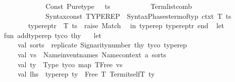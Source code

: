 \begin{isabellebody}
\ \ \ \ \ \ \ \ \ \ \ \ {\isacharparenleft}{\kern0pt}Const\ {\isacharparenleft}{\kern0pt}\isactrlconstUNDERSCOREsyntax {\isasymopen}Pure{\isachardot}{\kern0pt}type{\isasymclose}{\isacharcomma}{\kern0pt}\ {\isacharunderscore}{\kern0pt}{\isacharparenright}{\kern0pt}\ {\isacharcolon}{\kern0pt}{\isacharcolon}{\kern0pt}\ ts{\isacharparenright}{\kern0pt}\ {\isacharequal}{\kern0pt}\isanewline
\ \ \ \ \ \ \ \ \ \ Term{\isachardot}{\kern0pt}list{\isacharunderscore}{\kern0pt}comb\isanewline
\ \ \ \ \ \ \ \ \ \ \ \ {\isacharparenleft}{\kern0pt}Syntax{\isachardot}{\kern0pt}const\ \isactrlsyntaxUNDERSCOREconst {\isasymopen}{\isacharunderscore}{\kern0pt}TYPEREP{\isasymclose}\ {\isachardollar}{\kern0pt}\ Syntax{\isacharunderscore}{\kern0pt}Phases{\isachardot}{\kern0pt}term{\isacharunderscore}{\kern0pt}of{\isacharunderscore}{\kern0pt}typ\ ctxt\ T{\isacharcomma}{\kern0pt}\ ts{\isacharparenright}{\kern0pt}\isanewline
\ \ \ \ \ \ {\isacharbar}{\kern0pt}\ typerep{\isacharunderscore}{\kern0pt}tr{\isacharprime}{\kern0pt}\ {\isacharunderscore}{\kern0pt}\ T\ ts\ {\isacharequal}{\kern0pt}\ raise\ Match{\isacharsemicolon}{\kern0pt}\isanewline
\ \ in\ {\isacharbrackleft}{\kern0pt}{\isacharparenleft}{\kern0pt}\isactrlconstUNDERSCOREsyntax {\isasymopen}typerep{\isasymclose}{\isacharcomma}{\kern0pt}\ typerep{\isacharunderscore}{\kern0pt}tr{\isacharprime}{\kern0pt}{\isacharparenright}{\kern0pt}{\isacharbrackright}{\kern0pt}\ end\isanewline
{\isacartoucheclose}\isanewline
\isanewline
{}\isamarkupfalse%
\ {\isacartoucheopen}\isanewline
let\isanewline
\isanewline
fun\ add{\isacharunderscore}{\kern0pt}typerep\ tyco\ thy\ {\isacharequal}{\kern0pt}\isanewline
\ \ let\isanewline
\ \ \ \ val\ sorts\ {\isacharequal}{\kern0pt}\ replicate\ {\isacharparenleft}{\kern0pt}Sign{\isachardot}{\kern0pt}arity{\isacharunderscore}{\kern0pt}number\ thy\ tyco{\isacharparenright}{\kern0pt}\ \isactrlsort {\isasymopen}typerep{\isasymclose}{\isacharsemicolon}{\kern0pt}\isanewline
\ \ \ \ val\ vs\ {\isacharequal}{\kern0pt}\ Name{\isachardot}{\kern0pt}invent{\isacharunderscore}{\kern0pt}names\ Name{\isachardot}{\kern0pt}context\ {\isachardoublequote}{\kern0pt}{\isacharprime}{\kern0pt}a{\isachardoublequote}{\kern0pt}\ sorts{\isacharsemicolon}{\kern0pt}\isanewline
\ \ \ \ val\ ty\ {\isacharequal}{\kern0pt}\ Type\ {\isacharparenleft}{\kern0pt}tyco{\isacharcomma}{\kern0pt}\ map\ TFree\ vs{\isacharparenright}{\kern0pt}{\isacharsemicolon}{\kern0pt}\isanewline
\ \ \ \ val\ lhs\ {\isacharequal}{\kern0pt}\ \isactrlConst {\isasymopen}typerep\ ty{\isasymclose}\ {\isachardollar}{\kern0pt}\ Free\ {\isacharparenleft}{\kern0pt}{\isachardoublequote}{\kern0pt}T{\isachardoublequote}{\kern0pt}{\isacharcomma}{\kern0pt}\ Term{\isachardot}{\kern0pt}itselfT\ ty{\isacharparenright}{\kern0pt}{\isacharsemicolon}{\kern0pt}\isanewline

\end{isabellebody}
